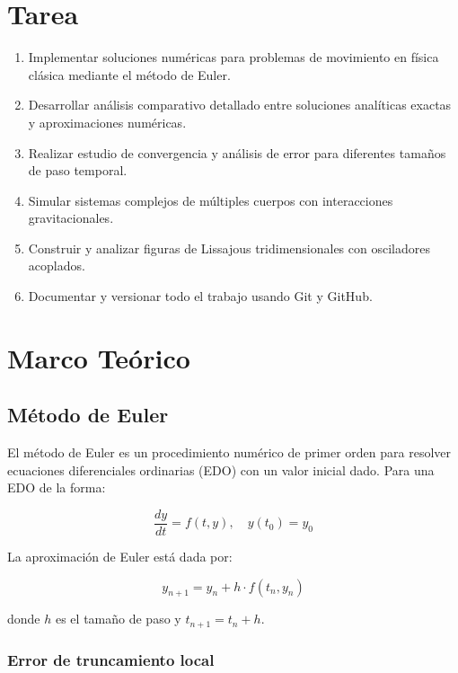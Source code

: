 \documentclass{article}
\begin{document}
	\section{Tarea}
	\begin{enumerate}		
		\item Implementar soluciones numéricas para problemas de movimiento en física clásica mediante el método de Euler.
		\item Desarrollar análisis comparativo detallado entre soluciones analíticas exactas y aproximaciones numéricas.
		\item Realizar estudio de convergencia y análisis de error para diferentes tamaños de paso temporal.
		\item Simular sistemas complejos de múltiples cuerpos con interacciones gravitacionales.
		\item Construir y analizar figuras de Lissajous tridimensionales con osciladores acoplados.
		\item Documentar y versionar todo el trabajo usando Git y GitHub.
	\end{enumerate}
		
	\section{Marco Teórico}
	
	\subsection{Método de Euler}
	
	El método de Euler es un procedimiento numérico de primer orden para resolver ecuaciones diferenciales ordinarias (EDO) con un valor inicial dado. Para una EDO de la forma:
	
	\begin{equation}
		\frac{dy}{dt} = f(t, y), \quad y(t_0) = y_0
	\end{equation}
	
	La aproximación de Euler está dada por:
	
	\begin{equation}
		y_{n+1} = y_n + h \cdot f(t_n, y_n)
	\end{equation}
	
	donde $h$ es el tamaño de paso y $t_{n+1} = t_n + h$.
	
	\subsubsection{Error de truncamiento local}
	
\end{document}
